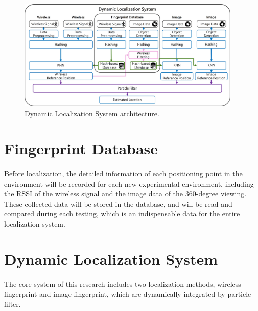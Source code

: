 \documentclass[a4paper,12pt]{report}
\begin{document}
\begin{figure}[tbph]
    \begin{center}
    \includegraphics[width=0.95\textwidth]{images/3_Dynamic_Localization_System.jpg}
    \caption{Dynamic Localization System architecture.}
    \label{figure:3_Hierarchical_Localization_System}
    \end{center}
\end{figure}

\section{Fingerprint Database}

\paragraph{}
Before localization, the detailed information of each positioning point in the environment will be recorded for each new experimental environment, including the RSSI of the wireless signal and the image data of the 360-degree viewing. These collected data will be stored in the database, and will be read and compared during each testing, which is an indispensable data for the entire localization system.
%

\section{Dynamic Localization System}

\paragraph{}
The core system of this research includes two localization methods, wireless fingerprint and image fingerprint, which are dynamically integrated by particle filter.
%
\end{document}
